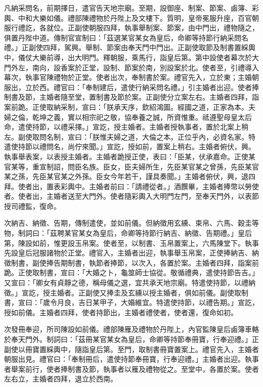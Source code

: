 凡納采問名，前期擇日，遣官告天地宗廟。至期，設御座、制案、節案、鹵簿、彩輿、中和大樂如儀。禮部陳禮物於丹陛上及文樓下。質明，皇帝冕服升座，百官朝服行禮訖，各就位。正副使朝服四拜，執事舉制案、節案，由中門出，禮物隨之，俱置丹陛中道。傳制官宣制曰：「茲選某官某女為皇后，命卿等持節行納采問名禮。」正副使四拜，駕興。舉制、節案由奉天門中門出。正副使取節及制書置綵輿中，儀仗大樂前導，出大明門。釋朝服，乘馬行，詣皇后第。第中設使者幕次於大門外左，南向，設香案於正堂，設制、節案於南，別設案於北。使者至，引禮導入幕次，執事官陳禮物於正堂。使者出次，奉制書於案。禮官先入，立於東；主婚朝服出，立於西。禮官曰：「奉制建后，遣使行納采問名禮。」引主婚者出迎。使者捧制書及節，主婚者隨至堂，置制書及節於案。正副使分立案左右。主婚者四拜，詣案前跪。正使取納采制，宣曰：「朕承天序，欽紹鴻圖。經國之道，正家為本。夫婦之倫，乾坤之義，實以相宗祀之敬，協奉養之誠，所資惟重。祗遵聖母皇太后命，遣使持節，以禮采擇。」宣訖，授主婚者。主婚者授執事者，置於北案上稍左。副使取問名制，宣曰：「朕惟夫婦之道，大倫之本。正位乎內，必資名家。特遣使持節以禮問名，尚佇來聞。」宣訖，授如前，置案上稍右。主婚者俯伏，興。執事舉表案，以表授主婚者。主婚者跪授正使，表曰：「臣某，伏承嘉命。正使某官某等，重宣制詔，問臣名族。臣女，臣夫婦所生，先臣某官某之曾孫，先臣某官某之孫，先臣某官某之外孫。臣女今年若干，謹具奏聞。」主婚者俯伏，興，退四拜。使者出，置表彩輿中。主婚者前曰：「請禮從者。」酒饌畢，主婚者捧幣以勞使者。使者出，主婚者送至大門外。使者隨彩輿入大明門左門，至奉天門外，以表節授司禮監，復命。

次納吉、納徵、告期，傳制遣使，並如前儀。但納徵用玄纁、束帛、六馬、穀圭等物，制詞曰：「茲聘某官某女為皇后，命卿等持節行納吉、納徵、告期禮。」皇后第，陳設如前，惟更設玉帛案。使者至，以制書、玉帛置案上，六馬陳堂下。執事先設皇后冠服諸物於正堂。禮官入，主婚者出迎，執事舉玉帛案，正使捧納吉、納徵制書，副使捧告期制書，執節者捧節，以次入，各置於案。主婚者四拜，詣案前跪。正使取制書，宣曰：「大婚之卜，龜筮師士協從。敬循禮典，遣使持節告吉。」又宣曰：「卿女有貞靜之德，稱母儀之選，宜共承天地宗廟。特遣使持節，以禮納徵。」宣訖，授主婚者。正副使又捧圭及玄纁以授主婚者，俱如前儀。副使取制書，宣曰：「歲令月良，吉日某甲子，大婚維宜。特遣使持節，以禮告期。」宣訖，授如前儀。主婚者四拜，使者持節出，主婚者禮使者，使者還，復命如初。

次發冊奉迎，所司陳設如前儀。禮部陳雁及禮物於丹陛上，內官監陳皇后鹵簿車輅於奉天門外。制詞曰：「茲冊某官某女為皇后，命卿等持節奉冊寶，行奉迎禮。」正副使以冊寶置綵輿中，隨詣皇后第。至門，取制書冊寶置案上。禮官先入，主婚者朝服出見。禮官曰：「奉制冊后，遣使持節奉冊寶，行奉迎禮。」主婚者出迎。執事者舉案前行，使者捧制書及節，執事者以雁及禮物從之。至堂中，各置於案。使者左右立，主婚者四拜，退立於西南。


